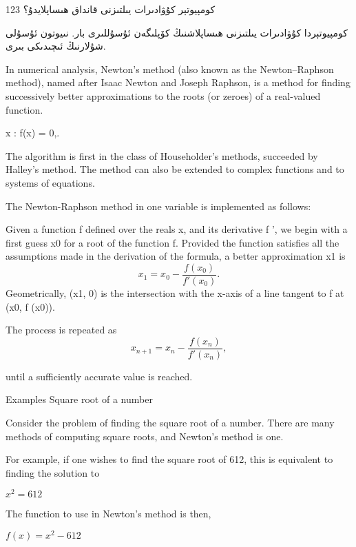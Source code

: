 \documentclass[24]{article}
\begin{document}
\textarabic{كومپيوتېر كۇۋادىرات يىلتىزنى قانداق ھىساپلايدۇ؟ 123}

\renewfontfamily{}%
\begin{Arabic}

كومپيوتېردا كۇۋادىرات يىلتىزنى ھىساپلاشنىڭ كۆپلىگەن ئۇسۇللىرى بار. نىيوتون ئۇسۇلى شۇلارنىڭ ئىچىدىكى بىرى. 
\end{Arabic}

In numerical analysis, Newton's method (also known as the Newton–Raphson method), named after Isaac Newton and Joseph Raphson, is a method for finding successively better approximations to the roots (or zeroes) of a real-valued function.

    x : f(x) = 0,.

The algorithm is first in the class of Householder's methods, succeeded by Halley's method. The method can also be extended to complex functions and to systems of equations.

The Newton-Raphson method in one variable is implemented as follows:

Given a function ƒ defined over the reals x, and its derivative ƒ ', we begin with a first guess x0 for a root of the function f. Provided the function satisfies all the assumptions made in the derivation of the formula, a better approximation x1 is
\begin{equation}
    x_{1} = x_0 - \frac{f(x_0)}{f'(x_0)}.
\end{equation}
Geometrically, (x1, 0) is the intersection with the x-axis of a line tangent to f at (x0, f (x0)).

The process is repeated as
\begin{equation}
    x_{n+1} = x_n - \frac{f(x_n)}{f'(x_n)} ,
\end{equation}

until a sufficiently accurate value is reached.


Examples
Square root of a number

Consider the problem of finding the square root of a number. There are many methods of computing square roots, and Newton's method is one.

For example, if one wishes to find the square root of 612, this is equivalent to finding the solution to

$    x^2 = 612$

The function to use in Newton's method is then,

   $ f(x) = x^2 - 612$
\end{document}
